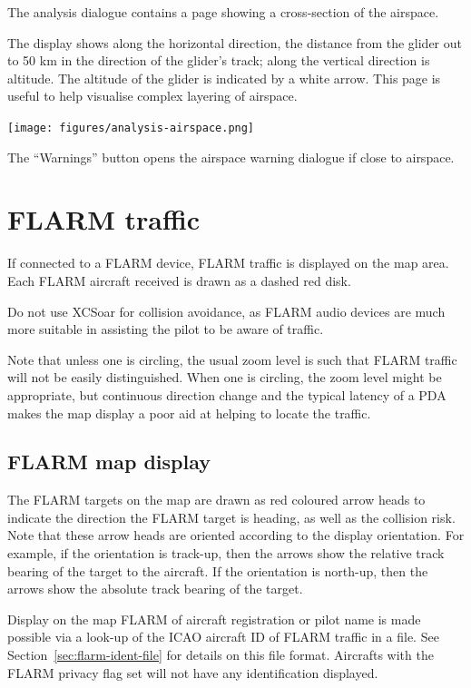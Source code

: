 The analysis dialogue contains a page showing a cross-section of the
airspace.

The display shows along the horizontal direction, the
distance from the glider out to 50 km in the direction of the glider's
track; along the vertical direction is altitude.  The altitude of the
glider is indicated by a white arrow.  This page is useful to help
visualise complex layering of airspace.

\begin{center}
\texttt{[image: figures/analysis-airspace.png]}
\end{center}

The ``Warnings'' button opens the airspace warning dialogue if close to
airspace.

\section{FLARM traffic}

If connected to a FLARM device, FLARM traffic is displayed on the map
area.  Each FLARM aircraft received is drawn as a dashed red disk.

\warning Do not use XCSoar for collision avoidance, as
FLARM audio devices are much more suitable in assisting the pilot to be
aware of traffic.

Note that unless one is circling, the usual zoom level is such that
FLARM traffic will not be easily distinguished. When one is circling,
the zoom level might be appropriate, but continuous direction change and
the typical latency of a PDA makes the map display a poor aid at helping
to locate the traffic.

\subsection*{FLARM map display}

The FLARM targets on the map are drawn as red coloured
arrow heads to indicate the direction the FLARM target is
heading, as well as the collision risk.  Note that these
arrow heads are oriented according to the display orientation.  For example, if
the orientation is track-up, then the arrows show the relative track bearing of
the target to the aircraft.  If the orientation is north-up, then the arrows show the
absolute track bearing of the target.

Display on the map FLARM of aircraft registration or pilot name is
made possible via a look-up of the ICAO aircraft ID of FLARM traffic
in a file.  See Section~\ref{sec:flarm-ident-file} for details on this
file format.  Aircrafts with the FLARM privacy flag set will not have
any identification displayed.

